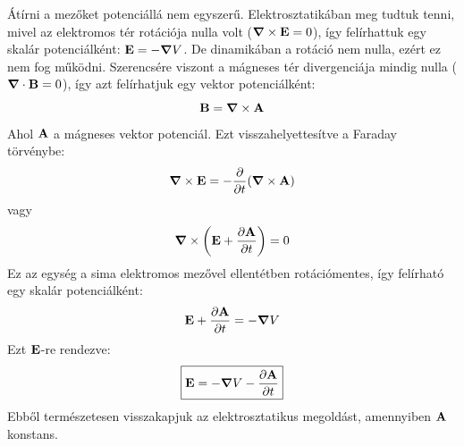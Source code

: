 \documentclass[a4paper,12pt]{article}
\begin{document}
Átírni a mezőket potenciállá nem egyszerű. Elektrosztatikában meg tudtuk tenni, mivel az elektromos tér rotációja nulla volt ($\boldsymbol{\nabla} \times \bold{E} = 0$), így felírhattuk egy skalár potenciálként: $\bold{E} = - \boldsymbol{\nabla} V$.
De dinamikában a rotáció nem nulla, ezért ez nem fog működni. Szerencsére viszont a mágneses tér divergenciája mindig nulla ($\boldsymbol{\nabla} \cdot \bold{B} = 0$), így azt felírhatjuk egy vektor potenciálként:
\begin{equation}
    \bold{B} = \boldsymbol{\nabla} \times \bold{A}
\end{equation}
Ahol $\bold{A}$ a mágneses vektor potenciál. Ezt visszahelyettesítve a Faraday törvénybe:
\begin{equation}
    \boldsymbol{\nabla} \times \bold{E} = - \frac{\partial }{\partial t} (\boldsymbol{\nabla} \times \bold{A})
\end{equation}
vagy
\begin{equation}
    \boldsymbol{\nabla} \times \left( \bold{E} + \frac{\partial \bold{A}}{\partial t} \right) = 0
\end{equation}
Ez az egység a sima elektromos mezővel ellentétben rotációmentes, így felírható egy skalár potenciálként:
\begin{equation}
    \bold{E} + \frac{\partial \bold{A}}{\partial t} = - \boldsymbol{\nabla} V
\end{equation}
Ezt $\bold{E}$-re rendezve:
\begin{equation}
    \boxed{\bold{E} = - \boldsymbol{\nabla} V - \frac{\partial \bold{A}}{\partial t}}
\end{equation}
Ebből természetesen visszakapjuk az elektrosztatikus megoldást, amennyiben $\bold{A}$ konstans.
\end{document}
